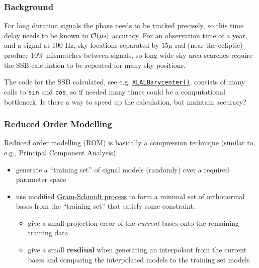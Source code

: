 \begin{frame}

\frametitle{Background}
\label{background}

For long duration signals the phase needs to be tracked precisely, so this time delay needs to be known
to $\mathcal{O}(\mu{\rm s})$ accuracy. For an observation time of a year, and a signal at 100 Hz, sky locations
separated by $15 \mu$ rad (near the ecliptic) produce 10\% mismatches between signals, so long wide-sky-area
searches require the SSB calculation to be repeated for many sky positions.

The code for the SSB calculated, see e.g.  \href{http://software.ligo.org/docs/lalsuite/lalpulsar/\_l\_a\_l\_barycenter\_8c\_source.html\#l00078}{\texttt{XLALBarycenter()}}, 
consists of many calls to \texttt{sin} and \texttt{cos}, so if needed many times could be a computational bottleneck. Is there a way to speed
up the calculation, but maintain accuracy?

\end{frame}

\begin{frame}

\frametitle{Reduced Order Modelling}
\label{reducedordermodelling}

Reduced order modelling (ROM) is basically a compression technique (similar to, e.g., Principal
Component Analysis).

\begin{itemize}
\item generate a ``training set'' of signal models (randomly) over a required parameter space

\item use modified  \href{https://en.wikipedia.org/wiki/Gram\%E2\%80\%93Schmidt\_process}{Gram-Schmidt process}  to form a
 minimal set of orthonormal bases from the ``training set'' that satisfy some constraint:

\begin{itemize}
\item give a small projection error of the \emph{current} bases onto the remaining training data

\item give a small \textbf{resdiual} when generating an interpolant from the current bases and
 comparing the interpolated models to the training set models

\end{itemize}

\end{itemize}

\end{frame}

